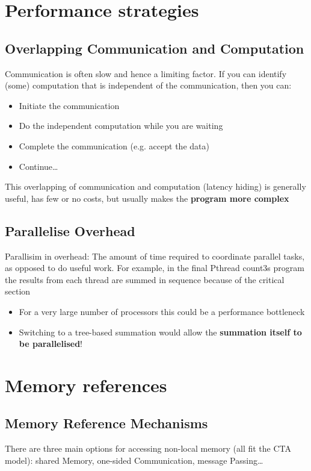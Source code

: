 \documentclass{article}
\begin{document}
\section{Performance strategies}

\subsection{Overlapping Communication and Computation}
\begin{flushleft}
Communication is often slow and hence a limiting factor. If you can identify (some) computation that is independent of the communication, then you can:
\begin{itemize}
  \item Initiate the communication
  \item Do the independent computation while you are waiting 
  \item Complete the communication (e.g. accept the data)
  \item Continue…
\end{itemize}
This overlapping of communication and computation (latency hiding) is generally useful, has few or no costs, but usually makes the \textbf{program more complex}
\end{flushleft}

\subsection{Parallelise	Overhead}
\begin{flushleft}
Parallisim in overhead: The amount of time required to coordinate parallel tasks, as opposed to do useful work. For example, in the final Pthread count3s program the results from each thread are summed in sequence because of the critical section
\begin{itemize}
  \item For a very large number of processors this could be a performance bottleneck 
  \item Switching to a tree-based summation would allow the \textbf{summation itself to be parallelised}!
\end{itemize}
\end{flushleft}

\section{Memory references}

\subsection{Memory Reference Mechanisms}
\begin{flushleft}
There are three main options for accessing non-local memory (all fit the CTA model): shared Memory, one-sided Communication, message Passing…
\end{flushleft}
\end{document}
